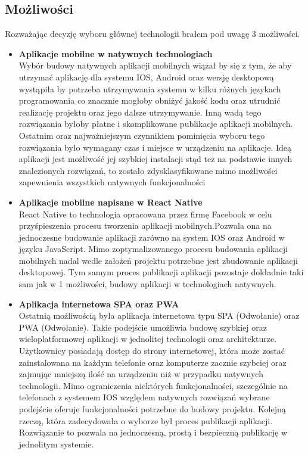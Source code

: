 \subsection{Możliwości}
Rozważając decyzję wyboru głównej technologii brałem pod uwagę 3 możliwości.
\begin{itemize}
    \item \textbf {Aplikacje mobilne w natywnych technologiach} \\
        Wybór budowy natywnych aplikacji mobilnych wiązał by się z tym, że aby utrzymać aplikację dla systemu IOS, Android oraz wersję desktopową wystąpiła by potrzeba utrzymywania systemu w kilku różnych językach programowania co znacznie mogłoby obniżyć jakość kodu oraz utrudnić realizację projektu oraz jego dalsze utrzymywanie. Inną wadą tego rozwiązania byłoby płatne i skomplikowane publikacje aplikacji mobilnych. Ostatnim oraz najważniejszym czynnikiem pominięcia wyboru tego rozwiązania było wymagany czas i miejsce w urządzeniu na aplikacje. Ideą aplikacji jest możliwość jej szybkiej instalacji stąd też na podstawie innych znalezionych rozwiązań, to zostało zdysklasyfikowane mimo możliwości zapewnienia wszystkich natywnych funkcjonalności

    \item \textbf {Aplikacje mobilne napisane w React Native} \\
        React Native to technologia opracowana przez firmę Facebook w celu przyśpieszenia procesu tworzenia aplikacji mobilnych.Pozwala ona na jednoczesne budowanie aplikacji zarówno na system IOS oraz Android w języku JavaScript. Mimo zoptymalizowanego procesu budowania aplikacji mobilnych nadal wedle założeń projektu potrzebne jest zbudowanie aplikacji desktopowej. Tym samym proces publikacji aplikacji pozostaje dokładnie taki sam jak w 1 możliwości, budowy aplikacji w technologiach natywnych.
    \item \textbf {Aplikacja internetowa SPA oraz PWA} \\
        Ostatnią możliwością była aplikacja internetowa typu SPA (Odwołanie) oraz PWA (Odwołanie). Takie podejście umożliwia budowę szybkiej oraz wieloplatformowej aplikacji w jednolitej technologii oraz architekturze. Użytkownicy posiadają dostęp do strony internetowej, która może zostać zainstalowana na każdym telefonie oraz komputerze zacznie szybciej oraz zajmując mniejszą ilość na urządzeniu niż w przypadku natywnych technologii. Mimo ograniczenia niektórych funkcjonalności, szczególnie na telefonach z systemem IOS względem natywnych rozwiązań wybrane podejście oferuje funkcjonalności potrzebne do budowy projektu. Kolejną rzeczą, która zadecydowała o wyborze był proces publikacji aplikacji. Rozwiązanie to pozwala na jednoczesną, prostą i bezpieczną publikację w jednolitym systemie.
\end{itemize}

